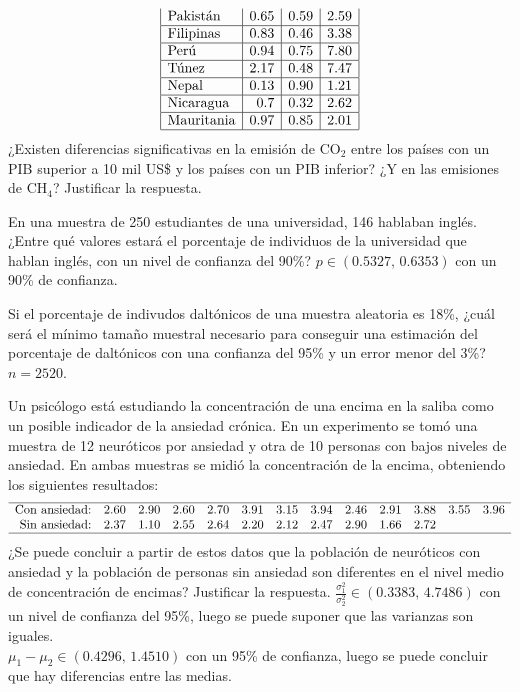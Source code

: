 {\[\begin{array}{|l|r|r|r|}
\mbox{Pakistán}    & 0.65 & 0.59	&  2.59\\ \hline
\mbox{Filipinas}   &	0.83 & 0.46	&  3.38\\ \hline
\mbox{Perú}        & 0.94 & 0.75	&  7.80\\ \hline
\mbox{Túnez}      & 2.17 & 0.48	&  7.47\\ \hline
\mbox{Nepal}       & 0.13 & 0.90	&  1.21\\ \hline
\mbox{Nicaragua}   & 0.7	 & 0.32	&  2.62\\ \hline
\mbox{Mauritania}  & 0.97 & 0.85	&  2.01\\ \hline
\end{array}
\]
¿Existen diferencias significativas en la emisión de CO$_2$ entre los países con un PIB superior a 10 mil US\$ y los
países con un PIB inferior? ¿Y en las emisiones de CH$_4$? Justificar la respuesta.
}
{}
{}


{En una muestra de 250 estudiantes de una universidad, 146 hablaban inglés.
¿Entre qué valores estará el porcentaje de individuos de la universidad que hablan inglés, con un nivel de confianza
del 90\%?
}
{
$p\in (0.5327,\,0.6353)$ con un 90\% de confianza.
}
{}


{Si el porcentaje de indivudos daltónicos de una muestra aleatoria es 18\%, ¿cuál será el mínimo tamaño muestral
necesario para conseguir una estimación del porcentaje de daltónicos con una confianza del 95\% y un error menor del 3\%?
}
{
$n=2520$.
}
{}


{Un psicólogo está estudiando la concentración de una encima en la saliba como un posible indicador de la ansiedad crónica.
En un experimento se tomó una muestra de 12 neuróticos por ansiedad y otra de 10 personas con bajos niveles de ansiedad.
En ambas muestras se midió la concentración de la encima, obteniendo los siguientes resultados:
\[
\begin{array}{rcccccccccccc}
\hline
\mbox{Con ansiedad:} & 2.60 & 2.90 & 2.60 & 2.70 & 3.91 & 3.15 & 3.94 & 2.46 & 2.91 & 3.88 & 3.55 & 3.96\\
\mbox{Sin ansiedad:} & 2.37 & 1.10 & 2.55 & 2.64 & 2.20 & 2.12 & 2.47 & 2.90 & 1.66 & 2.72 \\
\hline
\end{array}
\]
¿Se puede concluir a partir de estos datos que la población de neuróticos con ansiedad y la población de personas sin
ansiedad son diferentes en el nivel medio de concentración de encimas?
Justificar la respuesta.
}
{
$\frac{\sigma_1^2}{\sigma_2^2}\in (0.3383,\,4.7486)$ con un nivel de confianza del 95\%, luego se puede suponer que las
varianzas son iguales.\\
$\mu_1-\mu_2\in (0.4296,\,1.4510)$ con un 95\% de confianza, luego se puede concluir que hay diferencias entre las
medias.}
{}


